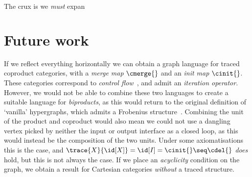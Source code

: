 \documentclass[10pt]{article}
\begin{document}
The crux is we \emph{must} expan

\section{Future work}

If we reflect everything horizontally we can obtain a graph language for traced coproduct categories, with a \emph{merge map} $\cmerge{}$ and an \emph{init map} $\cinit{}$.
These categories correspond to \emph{control flow}~\cite{selinger2010survey}, and admit an \emph{iteration operator}.
However, we would not be able to combine these two languages to create a suitable language for \emph{biproducts}, as this would return to the original definition of `vanilla' hypergraphs, which admits a Frobenius structure~\cite{bonchi2016rewriting}.
Combining the unit of the product and coproduct would also mean we could not use a dangling vertex picked by neither the input or output interface as a closed loop, as this would instead be the composition of the two units.
Under some axiomatisations this is the case, and $\trace{X}{\id[X]} = \id[I] = \cinit{} \seq \cdel{}$ \emph{does} hold, but this is not always the case. 
If we place an \emph{acyclicity} condition on the graph, we obtain a result for Cartesian categories \emph{without} a traced structure.


\end{document}
